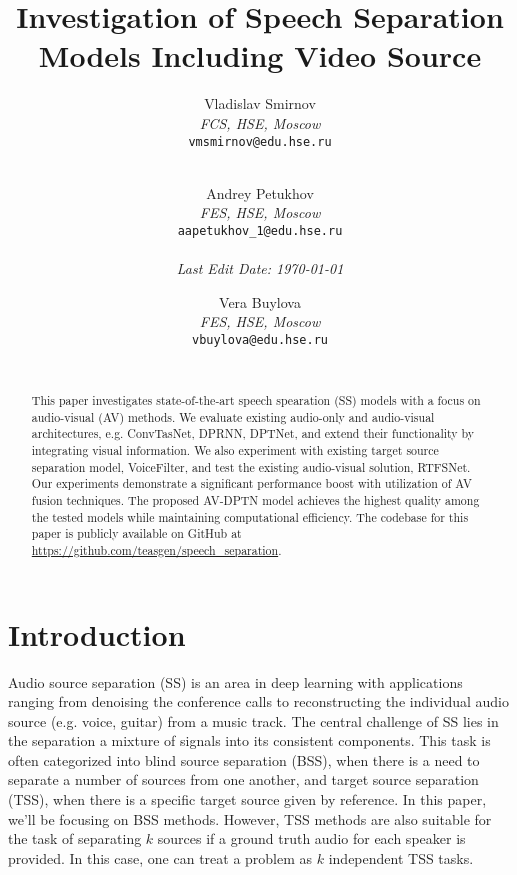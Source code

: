 \documentclass[10pt,conference,compsocconf]{IEEEtran}
\begin{document}
\title{Investigation of Speech Separation Models Including Video Source}

\author{
  Vladislav Smirnov\\
  \textit{FCS, HSE, Moscow}\\
  \texttt{vmsmirnov@edu.hse.ru}\\ \ \\
  \and
  Andrey Petukhov\\
  \textit{FES, HSE, Moscow}\\
  \texttt{aapetukhov\_1@edu.hse.ru}\\ \ \\
  \textit{Last Edit Date: \today}
  \and
  Vera Buylova\\
  \textit{FES, HSE, Moscow}\\
  \texttt{vbuylova@edu.hse.ru}\\ \ \\
}

\maketitle

\begin{abstract}
  This paper investigates state-of-the-art speech spearation (SS) models with a focus on audio-visual (AV) methods. We evaluate existing audio-only and audio-visual architectures, e.g. ConvTasNet, DPRNN, DPTNet, and extend their functionality by integrating visual information. We also experiment with existing target source separation model, VoiceFilter, and test the existing audio-visual solution, RTFSNet. Our experiments demonstrate a significant performance boost with utilization of AV fusion techniques. The proposed AV-DPTN model achieves the highest quality among the tested models while maintaining computational efficiency. The codebase for this paper is publicly available on GitHub at \url{https://github.com/teasgen/speech_separation}.
\end{abstract}

\section{Introduction}\label{sec:introduction}

Audio source separation (SS) is an area in deep learning with applications ranging from denoising the conference calls to reconstructing the individual audio source (e.g. voice, guitar) from a music track. The central challenge of SS lies in the separation a mixture of signals into its consistent components. This task is often categorized into blind source separation (BSS), when there is a need to separate a number of sources from one another, and target source separation (TSS), when there is a specific target source given by reference. In this paper, we'll be focusing on BSS methods. However, TSS methods are also suitable for the task of separating $\mathit{k}$ sources if a ground truth audio for each speaker is provided. In this case, one can treat a problem as $\mathit{k}$ independent TSS tasks. 
\end{document}
